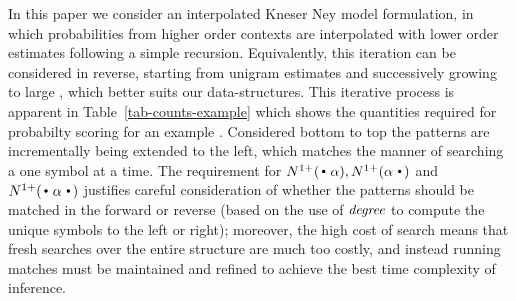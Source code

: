 In this paper we consider an interpolated Kneser Ney model formulation, in which
probabilities from higher order contexts are interpolated with lower
order estimates following a simple recursion. 
Equivalently, this iteration can be considered in reverse, starting from unigram
estimates and successively growing to large \ngrams, which better
suits our \CST data-structures.
This iterative process is apparent in Table~\ref{tab-counts-example} which
shows the quantities required for probabilty scoring for an example \ngram.
Considered bottom to top the patterns are incrementally being extended
to the left, which matches the manner of searching a \CST one symbol at a time.  
The requirement for $\nlplus{\dotpat}, \nlplus{\patdot}$ and
$\nlplus{\dotpatdot}$ justifies careful consideration of whether the
patterns should be matched in the forward or reverse \CST (based on the use 
of $\emph{degree}$ to compute the unique symbols to the left or right); moreover,
the high cost of search means that fresh searches over the entire
structure are much too costly, and instead running matches must be
maintained and refined to achieve the best time complexity of inference. 

\begin{table}[t]
\caption{Counts required for computing $P(\text{town} | \text{keep in
    the})$, and their values. Each line shows the different
  stages in the backoff computation, 4-gram through 1-gram.}
\label{tab-counts-example}
\end{table}

